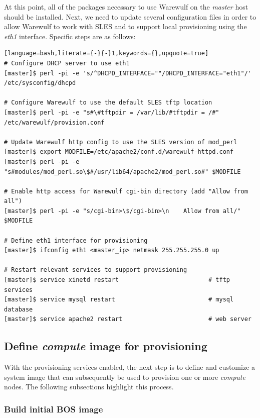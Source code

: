 \documentclass[letterpaper]{article}
\begin{document}
At this point, all of the packages necessary to use Warewulf on the {\em
  master} host should be installed.  Next, we need to update several
configuration files in order to allow Warewulf to work with SLES and to support
local provisioning using the {\em eth1} interface.  Specific steps are as
follows:


\begin{lstlisting}[language=bash,literate={-}{-}1,keywords={},upquote=true]
# Configure DHCP server to use eth1
[master]$ perl -pi -e 's/^DHCPD_INTERFACE=""/DHCPD_INTERFACE="eth1"/' /etc/sysconfig/dhcpd

# Configure Warewulf to use the default SLES tftp location
[master]$ perl -pi -e "s#\#tftpdir = /var/lib/#tftpdir = /#" /etc/warewulf/provision.conf

# Update Warewulf http config to use the SLES version of mod_perl
[master]$ export MODFILE=/etc/apache2/conf.d/warewulf-httpd.conf
[master]$ perl -pi -e "s#modules/mod_perl.so\$#/usr/lib64/apache2/mod_perl.so#" $MODFILE

# Enable http access for Warewulf cgi-bin directory (add "Allow from all")
[master]$ perl -pi -e "s/cgi-bin>\$/cgi-bin>\n    Allow from all/" $MODFILE

# Define eth1 interface for provisioning
[master]$ ifconfig eth1 <master_ip> netmask 255.255.255.0 up

# Restart relevant services to support provisioning
[master]$ service xinetd restart                         # tftp services
[master]$ service mysql restart                          # mysql database
[master]$ service apache2 restart                        # web server
\end{lstlisting}

\subsection{Define {\em compute} image for provisioning}

With the provisioning services enabled, the next step is to define and
customize a system image that can subsequently be used to provision one or more
{\em compute} nodes. The following subsections highlight this process.

\subsubsection{Build initial BOS image}
\end{document}
